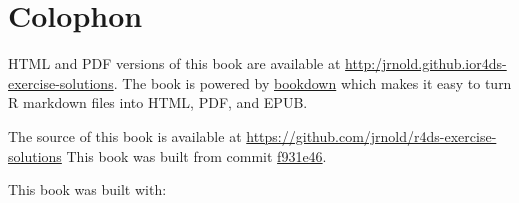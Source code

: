 \documentclass[]{book}
\theoremstyle{plain}
\theoremstyle{remark}
\begin{document}
\hypertarget{colophon}{%
\section*{Colophon}\label{colophon}}

HTML and PDF versions of this book are available at
\url{http:/jrnold.github.ior4ds-exercise-solutions}. The book is powered
by \href{https://bookdown.org}{bookdown} which makes it easy to turn R
markdown files into HTML, PDF, and EPUB.

The source of this book is available at
\url{https://github.com/jrnold/r4ds-exercise-solutions} This book was
built from commit
\href{https://github.com/jrnold/r4ds-exercise-solutions/tree/f931e4649fbf755249acad1ea2c38e47c5b05309}{f931e46}.

This book was built with:
\end{document}
